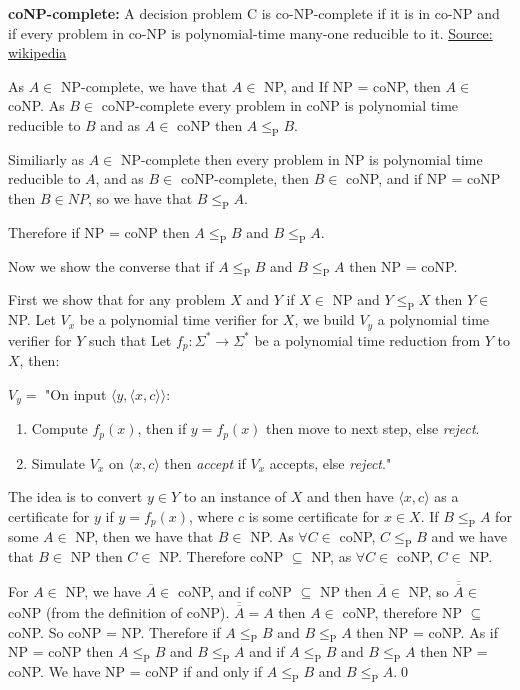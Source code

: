 \documentclass[addpoints]{exam}
\begin{document}
\begin{questions}
\begin{solution}
        \textbf{coNP-complete:} A decision problem C is co-NP-complete if it is in co-NP and if every problem in co-NP is polynomial-time many-one reducible to it. \href{https://en.wikipedia.org/wiki/Co-NP-complete}{Source: wikipedia}
        
        As $A\in$ NP-complete, we have that $A\in$ NP, and If NP = coNP, then $A\in$ coNP. As $B\in$ coNP-complete every problem in coNP is polynomial time reducible to $B$ and as $A\in$ coNP then $A\leq_\text{P} B$.
        
        Similiarly as $A\in$ NP-complete then every problem in NP is polynomial time reducible to $A$, and as $B\in$ coNP-complete, then $B\in$ coNP, and if NP = coNP then $B\in NP$, so we have that $B\leq_\text{P} A$.
        
        Therefore if NP = coNP then $A\leq_\text{P} B$ and $B\leq_\text{P} A$.
        
        Now we show the converse that if $A\leq_\text{P} B$ and  $B\leq_\text{P} A$ then NP = coNP.
        
        First we show that for any problem $X$ and $Y$ if $X\in$ NP and $Y\leq_\text{P} X$ then $Y\in$ NP. Let $V_x$ be a polynomial time verifier for $X$, we build $V_y$ a polynomial time verifier for $Y$ such that Let $f_p : \Sigma^* \to \Sigma^*$ be a polynomial time reduction from $Y$ to $X$, then:
        
        $V_y = $ "On input $\langle y , \langle x, c\rangle\rangle$:
        \begin{enumerate}
            \item Compute $f_p(x)$, then if $y = f_p(x)$ then move to next step, else \textit{reject}.
            \item Simulate $V_x$ on $\langle x, c\rangle$ then \textit{accept} if $V_x$ accepts, else \textit{reject}."
        \end{enumerate}
        The idea is to convert $y\in Y$ to an instance of $X$ and then have $\langle x, c\rangle$ as a certificate for $y$ if $y = f_p(x)$, where $c$ is some certificate for $x\in X$. If $B\leq_\text{P} A$ for some $A\in$ NP, then we have that $B\in$ NP. As $\forall C\in$ coNP, $C\leq_\text{P} B$ and we have that $B\in$ NP then $C\in$ NP. Therefore coNP $\subseteq$ NP, as $\forall C\in$ coNP, $C\in$ NP.
        
        For $A\in$ NP, we have $\overline{A}\in$ coNP, and if coNP $\subseteq$ NP then $\overline{A}\in$ NP, so $\overline{\overline{A}}\in$ coNP (from the definition of coNP). $\overline{\overline{A}} = A$ then $A\in$ coNP, therefore NP $\subseteq$ coNP. So coNP = NP. Therefore if $A\leq_\text{P} B$ and $B\leq_\text{P} A$ then NP = coNP. As if NP = coNP then $A\leq_\text{P} B$ and $B\leq_\text{P} A$ and if $A\leq_\text{P} B$ and $B\leq_\text{P} A$ then NP = coNP. We have NP = coNP if and only if $A\leq_\text{P} B$ and $B\leq_\text{P} A$.\hfill\qed
    \end{solution}
    

\end{questions}
\end{document}
